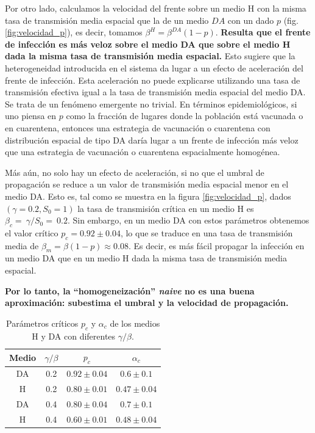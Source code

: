Por otro lado, calculamos la velocidad del frente sobre un medio H con la misma tasa de transmisión media espacial que la de un medio $DA$ con un dado $p$ (fig. \ref{fig:velocidad_p}), es decir, tomamos $\beta^H = \beta ^{DA}(1-p)$. \textbf{Resulta que el frente de infección es más veloz sobre el medio DA que sobre el medio H dada la misma tasa de transmisión media espacial.} Esto sugiere que la heterogeneidad introducida en el sistema da lugar a un efecto de aceleración del frente de infección. Esta aceleración no puede explicarse utilizando una tasa de transmisión efectiva igual a la tasa de transmisión media espacial del medio DA. Se trata de un fenómeno emergente no trivial. En términos epidemiológicos, si uno piensa en $p$ como la fracción de lugares donde la población está vacunada o en cuarentena, entonces una estrategia de vacunación o cuarentena con distribución espacial de tipo DA daría lugar a un frente de infección más veloz que una estrategia de vacunación o cuarentena espacialmente homogénea.

Más aún, no solo hay un efecto de aceleración, si no que el umbral de propagación se reduce a un valor de transmisión media espacial menor en el medio DA. Esto es, tal como se muestra en la figura \ref{fig:velocidad_p}, dados $(\gamma=0.2,S_0=1)$ la tasa de transmisión crítica en un medio H es $\beta_c =~ \gamma/S_0=~0.2$. Sin embargo, en un medio DA con estos parámetros obtenemos el valor crítico $p_c = 0.92\pm 0.04$, lo que se traduce en una tasa de transmisión media de $\beta_m = \beta (1-p) \approx 0.08$. Es decir, es más fácil propagar la infección en un medio DA que en un medio H dada la misma tasa de transmisión media espacial.

\textbf{Por lo tanto, la ``homogeneización'' \textit{naive} no es una buena aproximación: subestima el umbral y la velocidad de propagación.}

\begin{table}[!b]
    \centering
    \caption{Parámetros críticos $p_c$ y $\alpha_c$ de los medios H y DA con diferentes $\gamma/\beta$.}
    \label{tab:param_criticos}
    \begin{tabular}{@{}cccc@{}}
    \toprule
    Medio & $\gamma/\beta$ & $p_c$         & $\alpha_c$    \\ \midrule
    DA    & 0.2            & $0.92\pm0.04$ & $0.6\pm0.1$ \\
    H     & 0.2            & $0.80\pm0.01$ & $0.47\pm0.04$ \\
    DA    & 0.4            & $0.80\pm0.04$ & $0.7\pm0.1$ \\
    H     & 0.4            & $0.60\pm0.01$ & $0.48\pm0.04$ \\ \bottomrule
    \end{tabular}
\end{table}


